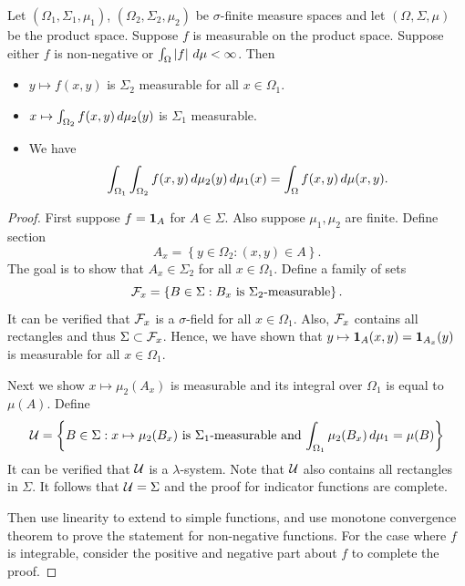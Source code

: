 \documentclass[a4paper]{article}
\begin{document}
\begin{thm}
  Let $(\Omega_1, \Sigma_1, \mu_1)$, $(\Omega_2, \Sigma_2, \mu_2)$
  be $\sigma$-finite measure spaces and let $(\Omega, \Sigma, \mu)$
  be the product space. Suppose $f$ is measurable on the product space.
  Suppose either $f$ is non-negative or $\int_\Omega \left\lvert f\right\rvert \, d \mu <
  \infty$. Then
  \begin{itemize}
    \item $y \mapsto f(x, y)$ is $\Sigma_2$ measurable for all $x \in \Omega_1$.
    \item $x \mapsto \int_{\Omega_2} f(x, y) \, d \mu_2 (y)$ is
    $\Sigma_1$ measurable.
    \item We have
    \[
    \int_{\Omega_1} \int_{\Omega_2} f(x, y) \, d \mu_2 (y) \, d \mu_1 (x)
    = \int_\Omega f(x, y) \, d \mu(x, y).
    \]
  \end{itemize}
\end{thm}

\begin{proof}
  First suppose $f = \operatorname{\mathbf{1}}_{A}$ for $A \in \Sigma$.
  Also suppose $\mu_1, \mu_2$ are finite. Define section
  \[
  A_x = \left\{ y \in \Omega_2 : (x, y) \in A \right\}.
  \]
  The goal is to show that $A_x \in \Sigma_2$ for all $x \in \Omega_1$.
  Define a family of sets
  \[
  \mathcal{F}_x = \left\{ B \in \Sigma : \text{$B_x$ is $\Sigma_2$-measurable} \right\}.
  \]
  It can be verified that $\mathcal{F}_x$ is a $\sigma$-field for all $x \in \Omega_1$.
  Also, $\mathcal{F}_x$ contains all rectangles and thus $\Sigma \subset \mathcal{F}_x$.
  Hence, we have shown that $y \mapsto \operatorname{\mathbf{1}}_A (x, y) = \operatorname{\mathbf{1}}_{A_x} (y)$
  is measurable for all $x \in \Omega_1$.

  Next we show $x \mapsto \mu_2 (A_x)$ is measurable
  and its integral over $\Omega_1$ is equal to $\mu (A)$.
  Define
  \[
  \mathcal{U} = \left\{ B \in \Sigma : \text{$x \mapsto \mu_2(B_x)$ is
  $\Sigma_1$-measurable and $\int_{\Omega_1} \mu_2(B_x) \, d \mu_1 = \mu (B)$} \right\}
  \]
  It can be verified that $\mathcal{U}$ is a $\lambda$-system.
  Note that $\mathcal{U}$ also contains all rectangles in $\Sigma$.
  It follows that $\mathcal{U} = \Sigma$ and the proof for
  indicator functions are complete.

  Then use linearity to extend to simple functions, and use monotone
  convergence theorem to prove the statement for non-negative functions.
  For the case where $f$ is integrable, consider the positive and
  negative part about $f$ to complete the proof.

\end{proof}
\end{document}
